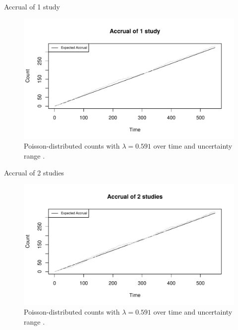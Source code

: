 \documentclass[english]{beamer}\usepackage[]{graphicx}\usepackage[]{xcolor}
\makeatletter
\def\maxwidth{ %
  \ifdim\Gin@nat@width>\linewidth
    \linewidth
  \else
    \Gin@nat@width
  \fi
}
\newenvironment{knitrout}{}{} %
\makeatother
\begin{document}
\begin{frame}{Accrual of 1 study}

\begin{figure}

\begin{knitrout}
\color{fgcolor}
\includegraphics[width=\maxwidth]{figures/figunnamed-chunk-2-1} 
\end{knitrout}
  \caption{Poisson-distributed counts with $\lambda = 0.591$ over time and uncertainty range \citep{spiegelhalter2011visualizing, pkgacc}.}
\end{figure}


\end{frame}

\begin{frame}{Accrual of 2 studies}

\begin{figure}

\begin{knitrout}
\color{fgcolor}
\includegraphics[width=\maxwidth]{figures/figunnamed-chunk-3-1} 
\end{knitrout}
  \caption{Poisson-distributed counts with $\lambda = 0.591$ over time and uncertainty range \citep{spiegelhalter2011visualizing, pkgacc}.}
\end{figure}


\end{frame}
\end{document}
